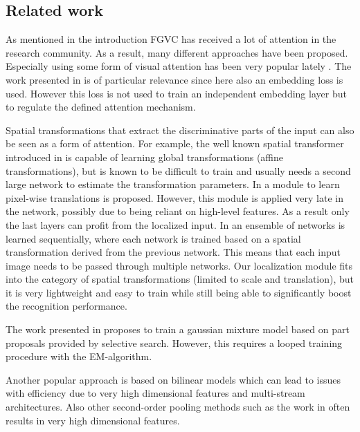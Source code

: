 \documentclass[10pt,twocolumn,letterpaper]{article}
\begin{document}
\subsection{Related work}
As mentioned in the introduction FGVC has received a lot of attention in the research community. As a result, many different approaches have been proposed. Especially using some form of visual attention has been very popular lately \cite{zheng2017learning,zhao2017diversified,yang2018learning,fu2017look,wu2018deep,li2017dynamic,sun2018multi}. The work presented in \cite{sun2018multi} is of particular relevance since here also an embedding loss is used. However this loss is not used to train an independent embedding layer but to regulate the defined attention mechanism.

Spatial transformations that extract the discriminative parts of the input can also be seen as a form of attention. For example, the well known spatial transformer introduced in \cite{jaderberg2015spatial} is capable of learning global transformations (\eg affine transformations), but is known to be difficult to train and usually needs a second large network to estimate the transformation parameters. In \cite{xu2018attend} a module to learn pixel-wise translations is proposed. However, this module is applied very late in the network, possibly due to being reliant on high-level features. As a result only the last layers can profit from the localized input. In \cite{simonelli2018increasingly} an ensemble of networks is learned sequentially, where each network is trained based on a spatial transformation derived from the previous network. This means that each input image needs to be passed through multiple networks. Our localization module fits into the category of spatial transformations (limited to scale and translation), but it is very lightweight and easy to train while still being able to significantly boost the recognition performance.

The work presented in \cite{liang2018gmm} proposes to train a gaussian mixture model based on part proposals provided by selective search. However, this requires a looped training procedure with the EM-algorithm.

Another popular approach is based on bilinear models \cite{lin2015bilinear} which can lead to issues with efficiency due to very high dimensional features and multi-stream architectures. Also other second-order pooling methods such as the work in \cite{li2018towards} often results in very high dimensional features.
\end{document}
